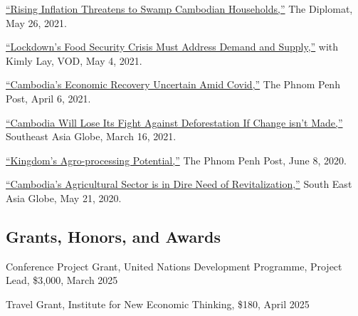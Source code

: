 \documentclass[10pt,a4paper]{article}
\begin{document}
	\href{https://thediplomat.com/2021/05/rising-inflation-threatens-to-swamp-cambodian-households/}{``Rising Inflation Threatens to Swamp Cambodian Households,''} The Diplomat, May 26, 2021.\\ \vspace{-.5em}

	\href{https://vodenglish.news/opinion-lockdowns-food-security-crisis-must-address-demand-and-supply/}{``Lockdown's Food Security Crisis Must Address Demand and Supply,''} with Kimly Lay, VOD, May 4, 2021.\\ \vspace{-.5em}

	\href{https://www.phnompenhpost.com/opinion/cambodias-economic-recovery-uncertain-amid-covid}{``Cambodia's Economic Recovery Uncertain Amid Covid,''} The Phnom Penh Post, April 6, 2021.\\ \vspace{-.5em}

	\href{https://southeastasiaglobe.com/cambodia-deforestation-fight/}{``Cambodia Will Lose Its Fight Against Deforestation If Change isn't Made,''} Southeast Asia Globe, March 16, 2021.\\ \vspace{-.5em}

	\href{https://www.phnompenhpost.com/opinion/kingdoms-agro-processing-potential}{``Kingdom’s Agro-processing Potential,''} The Phnom Penh Post, June 8, 2020.\\  \vspace{-.5em}

	 \href{https://southeastasiaglobe.com/cambodias-agricultural-sector-is-one-in-dire-need-of-revitalising}{``Cambodia’s Agricultural Sector is in Dire Need of Revitalization,''} South East Asia Globe, May 21, 2020.

\subsection*{Grants, Honors, and Awards}

\parindent=0pt

Conference Project Grant, United Nations Development Programme, Project Lead, \$3,000, March 2025

Travel Grant, Institute for New Economic Thinking, \$180, April 2025
\end{document}
